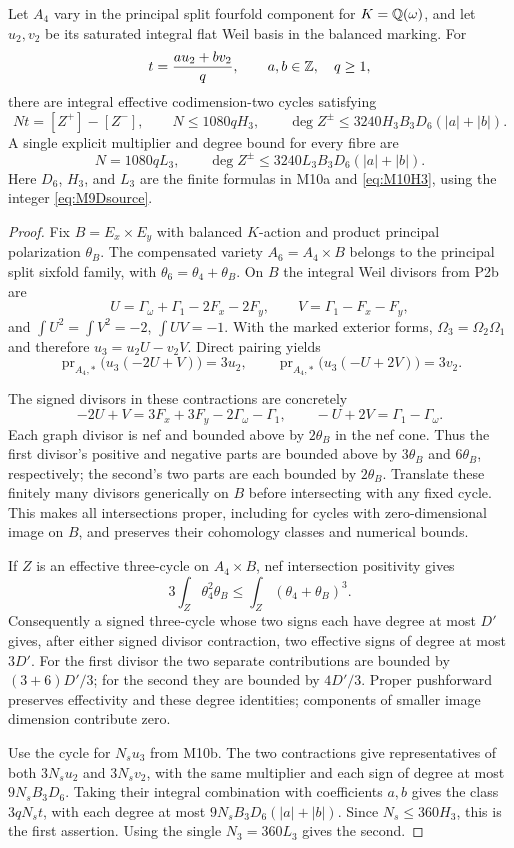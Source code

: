 \begin{theorem}\label{M10}
Let $A_4$ vary in the principal split fourfold component for
$K=\mathbb Q(\omega)$, and let $u_2,v_2$ be its saturated integral flat
Weil basis in the balanced marking. For
\[
 t=\frac{a u_2+b v_2}{q},\qquad a,b\in\mathbb Z,\quad q\ge1,
\]
there are integral effective codimension-two cycles satisfying
\[
 Nt=[Z^+]-[Z^-],\qquad
 N\le1080qH_3,\qquad
 \deg Z^\pm\le3240H_3B_3D_6(|a|+|b|).
\]
A single explicit multiplier and degree bound for every fibre are
\[
 N=1080qL_3,\qquad
 \deg Z^\pm\le3240L_3B_3D_6(|a|+|b|).
\]
Here $D_6$, $H_3$, and $L_3$ are the finite formulas in M10a and
\eqref{eq:M10H3}, using the integer \eqref{eq:M9Dsource}.
\end{theorem}
\begin{proof}
Fix $B=E_x\times E_y$ with balanced $K$-action and product principal
polarization $\theta_B$. The compensated variety
$A_6=A_4\times B$ belongs to the principal split sixfold family,
with $\theta_6=\theta_4+\theta_B$.
On $B$ the integral Weil divisors from P2b are
\[
 U=\Gamma_\omega+\Gamma_1-2F_x-2F_y,\qquad
 V=\Gamma_1-F_x-F_y,
\]
and
$\int U^2=\int V^2=-2$, $\int UV=-1$.
With the marked exterior forms,
$\Omega_3=\Omega_2\Omega_1$ and therefore
$u_3=u_2U-v_2V$. Direct pairing yields
\[
 \operatorname{pr}_{A_4,*}\bigl(u_3(-2U+V)\bigr)=3u_2,
 \qquad
 \operatorname{pr}_{A_4,*}\bigl(u_3(-U+2V)\bigr)=3v_2.
\]

The signed divisors in these contractions are concretely
\[
 -2U+V=3F_x+3F_y-2\Gamma_\omega-\Gamma_1,\qquad
 -U+2V=\Gamma_1-\Gamma_\omega.
\]
Each graph divisor is nef and bounded above by $2\theta_B$ in the
nef cone. Thus the first divisor's positive and negative parts
are bounded above by $3\theta_B$ and $6\theta_B$, respectively;
the second's two parts are each bounded by $2\theta_B$.
Translate these finitely many divisors generically on $B$ before
intersecting with any fixed cycle. This makes all intersections
proper, including for cycles with zero-dimensional image on $B$,
and preserves their cohomology classes and numerical bounds.

If $Z$ is an effective three-cycle on $A_4\times B$, nef
intersection positivity gives
\[
 3\int_Z\theta_4^2\theta_B
 \le\int_Z(\theta_4+\theta_B)^3.
\]
Consequently a signed three-cycle whose two signs each have degree
at most $D'$ gives, after either signed divisor contraction, two
effective signs of degree at most $3D'$.
For the first divisor the two separate contributions are bounded
by $(3+6)D'/3$; for the second they are bounded by $4D'/3$.
Proper pushforward preserves effectivity and these degree
identities; components of smaller image dimension contribute zero.

Use the cycle for $N_su_3$ from M10b. The two contractions give
representatives of both $3N_su_2$ and $3N_sv_2$, with the same
multiplier and each sign of degree at most $9N_sB_3D_6$.
Taking their integral combination with coefficients $a,b$ gives
the class $3qN_st$, with each degree at most
$9N_sB_3D_6(|a|+|b|)$. Since $N_s\le360H_3$, this is the first
assertion. Using the single $N_3=360L_3$ gives the second.
\end{proof}

